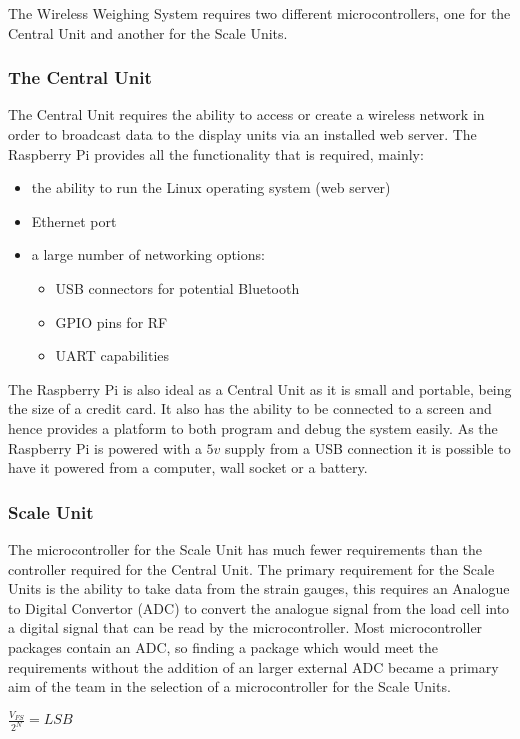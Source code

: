 The Wireless Weighing System requires two different microcontrollers, one for the Central Unit and another for the Scale Units. 
\subsubsection{The Central Unit}
The Central Unit requires the ability to access or create a wireless network in order to broadcast data to the display units via an installed web server. The Raspberry Pi \cite{raspberrypi} provides all the functionality that is required, mainly:
	\begin{itemize}
		\item the ability to run the Linux operating system (web server)
		\item Ethernet port
		\item a large number of networking options:
			\begin{itemize} 
				\item USB connectors for potential Bluetooth
				\item GPIO pins for RF
				\item UART capabilities
			\end{itemize}
	\end{itemize}
The Raspberry Pi is also ideal as a Central Unit as it is small and portable, being the size of a credit card. It also has the ability to be connected to a screen and hence provides a platform to both program and debug the system easily. As the Raspberry Pi is powered with a $5v$ supply from a USB connection it is possible to have it powered from a computer, wall socket or a battery.

\subsubsection{Scale Unit}
The microcontroller for the Scale Unit has much fewer requirements than the controller required for the Central Unit. The primary requirement for the Scale Units is the ability to take data from the strain gauges, this requires an Analogue to Digital Convertor (ADC) to convert the analogue signal from the load cell into a digital signal that can be read by the microcontroller. Most microcontroller packages contain an ADC, so finding a package which would meet the requirements without the addition of an larger external ADC became a primary aim of the team in the selection of a microcontroller for the Scale Units. 

\centerline{\(\frac{V_{FS}}{2^{N}} = LSB  \)} \cite[page 9]{edp2}
\label{LSBeq}

